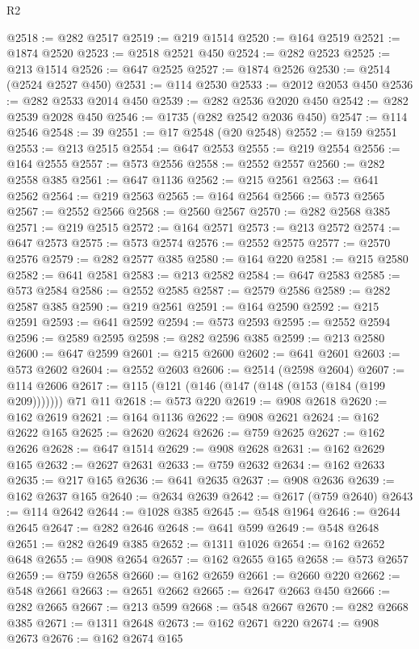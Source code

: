 \begin{lexlean}{R2}
\begin{coremodule}
@2518 := @282 @2517
@2519 := @219 @1514
@2520 := @164 @2519
@2521 := @1874 @2520
@2523 := @2518 @2521 @450
@2524 := @282 @2523
@2525 := @213 @1514
@2526 := @647 @2525
@2527 := @1874 @2526
@2530 := @2514 (@2524 @2527 @450)
@2531 := @114 @2530
@2533 := @2012 @2053 @450
@2536 := @282 @2533 @2014 @450
@2539 := @282 @2536 @2020 @450
@2542 := @282 @2539 @2028 @450
@2546 := @1735 (@282 @2542 @2036 @450)
@2547 := @114 @2546
@2548 := 39
@2551 := @17 @2548 (@20 @2548)
@2552 := @159 @2551
@2553 := @213 @2515
@2554 := @647 @2553
@2555 := @219 @2554
@2556 := @164 @2555
@2557 := @573 @2556
@2558 := @2552 @2557
@2560 := @282 @2558 @385
@2561 := @647 @1136
@2562 := @215 @2561
@2563 := @641 @2562
@2564 := @219 @2563
@2565 := @164 @2564
@2566 := @573 @2565
@2567 := @2552 @2566
@2568 := @2560 @2567
@2570 := @282 @2568 @385
@2571 := @219 @2515
@2572 := @164 @2571
@2573 := @213 @2572
@2574 := @647 @2573
@2575 := @573 @2574
@2576 := @2552 @2575
@2577 := @2570 @2576
@2579 := @282 @2577 @385
@2580 := @164 @220
@2581 := @215 @2580
@2582 := @641 @2581
@2583 := @213 @2582
@2584 := @647 @2583
@2585 := @573 @2584
@2586 := @2552 @2585
@2587 := @2579 @2586
@2589 := @282 @2587 @385
@2590 := @219 @2561
@2591 := @164 @2590
@2592 := @215 @2591
@2593 := @641 @2592
@2594 := @573 @2593
@2595 := @2552 @2594
@2596 := @2589 @2595
@2598 := @282 @2596 @385
@2599 := @213 @2580
@2600 := @647 @2599
@2601 := @215 @2600
@2602 := @641 @2601
@2603 := @573 @2602
@2604 := @2552 @2603
@2606 := @2514 (@2598 @2604)
@2607 := @114 @2606
@2617 := @115 (@121 (@146 (@147 (@148 (@153 (@184 (@199 @209))))))) @71 @11
@2618 := @573 @220
@2619 := @908 @2618
@2620 := @162 @2619
@2621 := @164 @1136
@2622 := @908 @2621
@2624 := @162 @2622 @165
@2625 := @2620 @2624
@2626 := @759 @2625
@2627 := @162 @2626
@2628 := @647 @1514
@2629 := @908 @2628
@2631 := @162 @2629 @165
@2632 := @2627 @2631
@2633 := @759 @2632
@2634 := @162 @2633
@2635 := @217 @165
@2636 := @641 @2635
@2637 := @908 @2636
@2639 := @162 @2637 @165
@2640 := @2634 @2639
@2642 := @2617 (@759 @2640)
@2643 := @114 @2642
@2644 := @1028 @385
@2645 := @548 @1964
@2646 := @2644 @2645
@2647 := @282 @2646
@2648 := @641 @599
@2649 := @548 @2648
@2651 := @282 @2649 @385
@2652 := @1311 @1026
@2654 := @162 @2652 @648
@2655 := @908 @2654
@2657 := @162 @2655 @165
@2658 := @573 @2657
@2659 := @759 @2658
@2660 := @162 @2659
@2661 := @2660 @220
@2662 := @548 @2661
@2663 := @2651 @2662
@2665 := @2647 @2663 @450
@2666 := @282 @2665
@2667 := @213 @599
@2668 := @548 @2667
@2670 := @282 @2668 @385
@2671 := @1311 @2648
@2673 := @162 @2671 @220
@2674 := @908 @2673
@2676 := @162 @2674 @165

\end{coremodule}
\end{lexlean}
